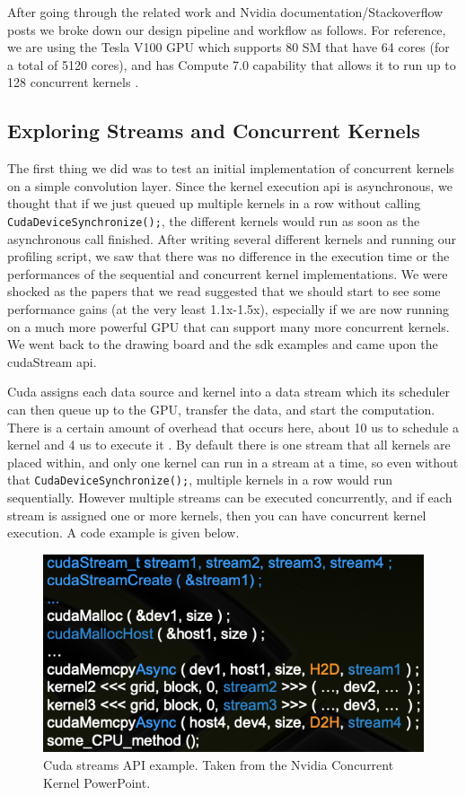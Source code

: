 \documentclass[sigconf]{acmart}
\begin{document}
After going through the related work and Nvidia documentation/Stackoverflow posts we broke down our design pipeline and workflow as follows. For reference, we are using the Tesla V100 GPU which supports 80 SM that have 64 cores (for a total of 5120 cores), and has Compute 7.0 capability that allows it to run up to 128 concurrent kernels \cite{nvidia_spec}. 

\subsection{Exploring Streams and Concurrent Kernels}
The first thing we did was to test an initial implementation of concurrent kernels on a simple convolution layer. Since the kernel execution api is asynchronous, we thought that if we just queued up multiple kernels in a row without calling \lstinline{CudaDeviceSynchronize();}, the different kernels would run as soon as the asynchronous call finished. After writing several different kernels and running our profiling script, we saw that there was no difference in the execution time or the performances of the sequential and concurrent kernel implementations. We were shocked as the papers that we read suggested that we should start to see some performance gains (at the very least 1.1x-1.5x), especially if we are now running on a much more powerful GPU that can support many more concurrent kernels. We went back to the drawing board and the sdk examples and came upon the cudaStream api.

Cuda assigns each data source and kernel into a data stream which its scheduler can then queue up to the GPU, transfer the data, and start the computation. There is a certain amount of overhead that occurs here, about 10 us to schedule a kernel and 4 us to execute it \cite{michaelmichael}. By default there is one stream that all kernels are placed within, and only one kernel can run in a stream at a time, so even without that \lstinline{CudaDeviceSynchronize();}, multiple kernels in a row would run sequentially. However multiple streams can be executed concurrently, and if each stream is assigned one or more kernels, then you can have concurrent kernel execution. A code example is given below. 

\begin{figure}[h]
  \centering
  \includegraphics[width=\linewidth]{img/image1}
  \caption{Cuda streams API example. Taken from the Nvidia Concurrent Kernel PowerPoint. \cite{nvidia_concurrent}}
\end{figure}
\end{document}
